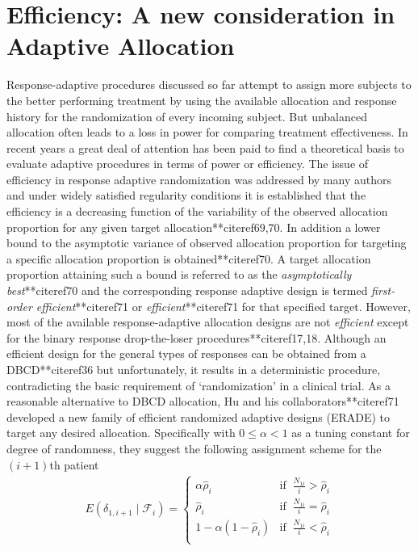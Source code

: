 \section{Efficiency: A new consideration in Adaptive Allocation}

Response-adaptive procedures discussed so far  attempt to assign more subjects to the better performing treatment by using the available allocation and response history for the randomization of every incoming subject. But unbalanced  allocation  often leads to a loss in power for comparing treatment effectiveness. In recent years a great deal of attention has been paid to find a theoretical basis to evaluate adaptive procedures in terms of power or efficiency. The issue of efficiency in response adaptive randomization was addressed  by  many authors and under widely satisfied regularity conditions it is established that the efficiency is a decreasing function of the variability  of the observed allocation proportion for any given target allocation**citeref{69,70}. In addition a lower bound to the asymptotic variance of observed allocation proportion for targeting a specific allocation proportion is obtained**citeref{70}. A target allocation proportion attaining such a bound is referred to as the \textit{asymptotically best}**citeref{70} and the corresponding response adaptive design is termed  \textit{first-order efficient}**citeref{71} or \textit{efficient}**citeref{71} for that specified target. However, most of the available response-adaptive allocation designs are not \textit{efficient} except for the binary response drop-the-loser procedures**citeref{17,18}. Although an efficient design for the general types of responses can be obtained from a DBCD**citeref{36} but unfortunately, it results in a deterministic procedure, contradicting the basic requirement of `randomization' in a clinical trial. As a reasonable alternative to DBCD allocation, Hu and his collaborators**citeref{71} developed a new family of efficient randomized adaptive designs (ERADE) to target any desired allocation. Specifically with $0\leq \alpha <1$ as a tuning constant for degree of randomness, they suggest the following assignment scheme for the $(i+1)$th patient
 \begin{eqnarray*}
E(\delta_{1,i+1}\mid \mathcal{F}_{i})=
\left\{\begin{array}{ll}
\alpha \hat{\rho}_{i} & \mbox{if }~\frac{N_{1i}}{i}>\hat{\rho}_{i}\\
\hat{\rho}_{i}& \mbox{if }~\frac{N_{1i}}{i}=\hat{\rho}_{i}\\
1-\alpha (1-\hat{\rho}_{i}) & \mbox{if }~\frac{N_{1i}}{i}<\hat{\rho}_{i}\\
\end{array}\right.
\end{eqnarray*}
